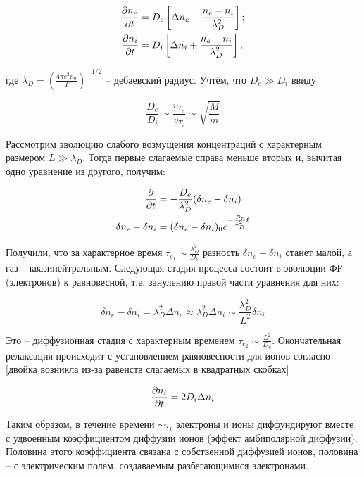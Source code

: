\documentclass[10pt, a4paper]{article}
\begin{document}
\begin{align*}
	\pdv{n_e}{t} &= D_e\left[\Delta n_e-\frac{n_e-n_i}{\lambda_D^2}\right];\\
	\pdv{n_i}{t} &= D_i\left[\Delta n_i+\frac{n_e-n_i}{\lambda_D^2}\right],
\end{align*}

где $\lambda_D = \left(\frac{4\pi e^2 n_0}{T}\right)^{-1/2}$ -- дебаевский радиус. Учтём, что $D_e\gg D_i$ ввиду

\begin{equation*}
	\frac{D_e}{D_i}\sim\frac{v_{T_e}}{v_{T_i}}\sim\sqrt{\frac{M}{m}}
\end{equation*}

Рассмотрим эволюцию слабого возмущения концентраций с характерным размером $L\gg\lambda_D$. Тогда первые слагаемые справа меньше вторых и, вычитая одно уравнение из другого, получим:

\begin{align*}
	\pdv{}{t}(\delta n_e-\delta n_i) &= -\frac{D_e}{\lambda_D^2} (\delta n_e-\delta n_i) \\
	\delta n_e-\delta n_i &= (\delta n_e-\delta n_i)_0e^{-\frac{D_e}{\lambda_D^2}t}
\end{align*}

Получили, что за характерное время $\tau_{e_1} \sim \frac{\lambda_D^2}{D_e}$ разность $\delta n_e-\delta n_i$ станет малой, а газ -- квазинейтральным. Следующая стадия процесса состоит в эволюции ФР (электронов) к равновесной, т.е. занулению правой части уравнения для них:

\begin{equation*}
	\delta n_e-\delta n_i = \lambda_D^2\Delta n_e \approx \lambda_D^2\Delta n_i \sim \frac{\lambda_D^2}{L^2}\delta n_i
\end{equation*}

Это -- диффузионная стадия с характерным временем $\tau_{e_2}\sim \frac{L^2}{D_e}$. Окончательная релаксация происходит с установлением равновесности для ионов согласно [двойка возникла из-за равенств слагаемых в квадратных скобках]

\begin{equation*}
	\pdv{n_i}{t} = 2D_i\Delta n_i
\end{equation*}

Таким образом, в течение времени $\sim \tau_i$ электроны и ионы диффундируют вместе с удвоенным коэффициентом диффузии ионов (эффект \uline{амбиполярной диффузии}). Половина этого коэффициента связана с собственной диффузией ионов, половина -- с электрическим полем, создаваемым разбегающимися электронами.
\end{document}
